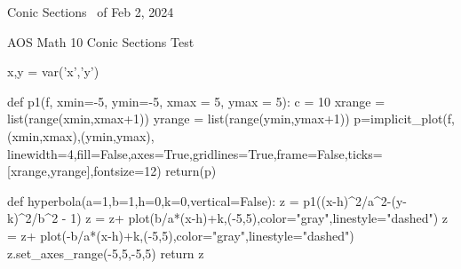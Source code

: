 \documentclass{exam}
\begin{document}
\pagestyle{headandfoot}
\runningheadrule
{}
{Conic Sections \thepage\ of \numpages}
{Feb 2, 2024}

\noindent
{\Large AOS Math 10 Conic Sections Test}
\vspace{2ex}

\noindent
\vspace{5mm}

\noindent
\vspace{5mm}

\vspace{4ex}

\newcommand{\tf}[1][{}]{%
\fillin[#1][0.25in]%
}
\newcommand{\hyperbola}[4]{%
	$\dfrac{\sage{(x-#1)^2}}{\sage{#3^2}} - \dfrac{\sage{(y-#2)^2}}{\sage{#4^2}}$
}

\begin{sagesilent}
	x,y = var('x','y')

	def p1(f, xmin=-5, ymin=-5, xmax = 5, ymax = 5):
		  c = 10
		  xrange = list(range(xmin,xmax+1))
		  yrange = list(range(ymin,ymax+1))
		  p=implicit_plot(f,(xmin,xmax),(ymin,ymax),
			linewidth=4,fill=False,axes=True,gridlines=True,frame=False,ticks=[xrange,yrange],fontsize=12)
		  return(p)

	def hyperbola(a=1,b=1,h=0,k=0,vertical=False):
		  z = p1((x-h)^2/a^2-(y-k)^2/b^2 - 1)
		  z = z+ plot(b/a*(x-h)+k,(-5,5),color="gray",linestyle="dashed")
		  z = z+ plot(-b/a*(x-h)+k,(-5,5),color="gray",linestyle="dashed")
		  z.set_axes_range(-5,5,-5,5)
		  return z
\end{sagesilent}
\end{document}
